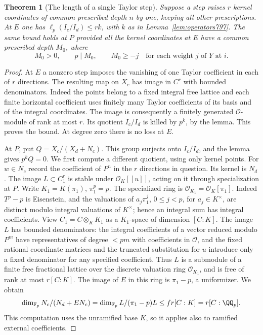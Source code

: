 \documentclass[a4paper,11pt]{article}
\newtheorem{theorem}[proposition]{Theorem}
\theoremstyle{definition}
\theoremstyle{remark}
\numberwithin{equation}{section}
\begin{document}
\begin{theorem}[The length of a single Taylor step]
\leavevmode\label{thm:jetlength797}
Suppose a step raises \(r\) kernel coordinates of common
prescribed depth \(n\) by one, keeping all other prescriptions.
At \(E\) one has \(\ell_p(I_c/I_d)\le r k\), with \(k\) as
in Lemma~\ref{lem:operators797}. The same bound holds at
\(P\) provided all the kernel coordinates at \(E\) have a
common prescribed depth \(M_0\), where
\[
    M_0>0,\qquad p\mid M_0,\qquad M_0\ge -j
        \quad\text{for each weight \(j\) of \(Y\) at \(i\)} .
\]
\end{theorem}
\begin{proof}
At \(E\) a nonzero step imposes the vanishing of one Taylor
coefficient in each of \(r\) directions. The resulting map on
\(X_c\) has image in \(C^r\) with bounded denominators. Indeed
the points belong to a fixed integral free lattice and each
finite horizontal coefficient uses finitely many Taylor
coefficients of its basis and of the integral coordinates.
The image is consequently a finitely generated
\(\mathcal O\)-module of rank at most \(r\).
Its quotient \(I_c/I_d\) is killed by \(p^k\), by the lemma.
This proves the bound. At degree zero there is no loss at \(E\).

At \(P\), put \(Q=X_c/(X_d+N_c)\). This group surjects onto
\(I_c/I_d\), and the lemma gives \(p^kQ=0\). We first
compute a different quotient, using only kernel points.
For \(w\in N_c\) record the coefficient of \(P^n\) in the
\(r\) directions in question. Its kernel is \(N_d\).
The image \(L\subset C_1^r\) is stable under
\(\mathcal O_K[[u]]\), acting on it through specialization
at \(P\). Write \(K_1=K(\pi_1)\), \(\pi_1^p=p\). The
specialized ring is \(\mathcal O_{K_1}=\mathcal O_K[\pi_1]\).
Indeed \(T^p-p\) is Eisenstein, and the valuations of
\(a_j\pi_1^j\), \(0\le j<p\), for \(a_j\in K^\times\),
are distinct modulo integral valuations of \(K^\times\);
hence an integral sum has integral coefficients.
View \(C_1=C\otimes_K K_1\) as a \(K_1\)-space of
dimension \([C:K]\). The image \(L\) has bounded denominators:
the integral coefficients of a vector reduced modulo \(P^m\)
have representatives of degree \(<pm\) with coefficients in
\(\mathcal O\), and the fixed rational coordinate matrices
and the truncated substitution for \(u\) introduce only a
fixed denominator for any specified coefficient. Thus \(L\)
is a submodule of a finite free fractional lattice over the
discrete valuation ring \(\mathcal O_{K_1}\), and is free
of rank at most \(r[C:K]\). The image of \(E\) in this ring
is \(\pi_1-p\), a uniformizer. We obtain
\[
    \dim_{\mathbb F_p} N_c/(N_d+E N_c)
       =\dim_{\mathbb F_p} L/(\pi_1-p)L
       \le f r[C:K]=r[C:\QQ_p].
\]
This computation uses the unramified base \(K\), so it applies
also to ramified external coefficients.


\end{proof}
\end{document}
